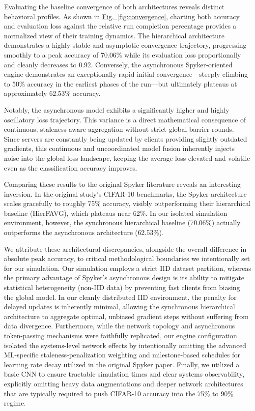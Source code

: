 \documentclass[conference]{IEEEtran}
\newcommand{\figref}[1]{\hyperref[#1]{Fig.~\ref*{#1}}}
\begin{document}
Evaluating the baseline convergence of both architectures reveals distinct behavioral profiles. As shown in \figref{fig:convergence}, charting both accuracy and evaluation loss against the relative run completion percentage provides a normalized view of their training dynamics. The hierarchical architecture demonstrates a highly stable and asymptotic convergence trajectory, progressing smoothly to a peak accuracy of 70.06\% while its evaluation loss proportionally and cleanly decreases to 0.92. Conversely, the asynchronous Spyker-oriented engine demonstrates an exceptionally rapid initial convergence—steeply climbing to 50\% accuracy in the earliest phases of the run—but ultimately plateaus at approximately 62.53\% accuracy. 

Notably, the asynchronous model exhibits a significantly higher and highly oscillatory loss trajectory. This variance is a direct mathematical consequence of continuous, staleness-aware aggregation without strict global barrier rounds. Since servers are constantly being updated by clients providing slightly outdated gradients, this continuous and uncoordinated model fusion inherently injects noise into the global loss landscape, keeping the average loss elevated and volatile even as the classification accuracy improves.

Comparing these results to the original Spyker literature \cite{zuo2024} reveals an interesting inversion. In the original study's CIFAR-10 benchmarks, the Spyker architecture scales gracefully to roughly 75\% accuracy, visibly outperforming their hierarchical baseline (HierFAVG), which plateaus near 62\%. In our isolated simulation environment, however, the synchronous hierarchical baseline (70.06\%) actually outperforms the asynchronous architecture (62.53\%). 

We attribute these architectural discrepancies, alongside the overall difference in absolute peak accuracy, to critical methodological boundaries we intentionally set for our simulation. Our simulation employs a strict IID dataset partition, whereas the primary advantage of Spyker's asynchronous design is its ability to mitigate statistical heterogeneity (non-IID data) by preventing fast clients from biasing the global model. In our cleanly distributed IID environment, the penalty for delayed updates is inherently minimal, allowing the synchronous hierarchical architecture to aggregate optimal, unbiased gradient steps without suffering from data divergence. Furthermore, while the network topology and asynchronous token-passing mechanisms were faithfully replicated, our engine configuration isolated the systems-level network effects by intentionally omitting the advanced ML-specific staleness-penalization weighting and milestone-based schedules for learning rate decay utilized in the original Spyker paper. Finally, we utilized a basic CNN to ensure tractable simulation times and clear systems observability, explicitly omitting heavy data augmentations and deeper network architectures that are typically required to push CIFAR-10 accuracy into the 75\% to 90\% regime.
\end{document}

